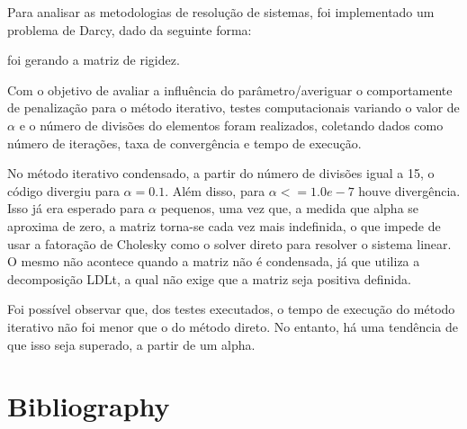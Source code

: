 \documentclass[12pt]{article}
\begin{document}
Para analisar as metodologias de resolução de sistemas, foi implementado um problema de Darcy, dado da seguinte forma:


foi gerando a matriz de rigidez. 

Com o objetivo de avaliar a influência do parâmetro/averiguar o comportamente de penalização para o método iterativo, testes computacionais 
variando o valor de \(\alpha\) e o número de divisões do elementos foram realizados, coletando dados como número de iterações, taxa de 
convergência e tempo de execução.

No método iterativo condensado, a partir do número de divisões igual a 15, o código divergiu para \(\alpha=0.1\). Além disso, para \(\alpha<=1.0e-7\) 
houve divergência. Isso já era esperado para \(\alpha\) pequenos, uma vez que, a medida que alpha se aproxima de zero, a matriz torna-se cada vez 
mais indefinida, o que impede de usar a fatoração de Cholesky como o solver direto para resolver o sistema linear. O mesmo não acontece quando a 
matriz não é condensada, já que utiliza a decomposição LDLt, a qual não exige que a matriz seja positiva definida.


Foi possível observar que, dos testes executados, o tempo de execução do método iterativo não foi menor que o do método direto. No entanto, há uma 
tendência de que isso seja superado, a partir de um alpha.

\section{Bibliography}
\end{document}
